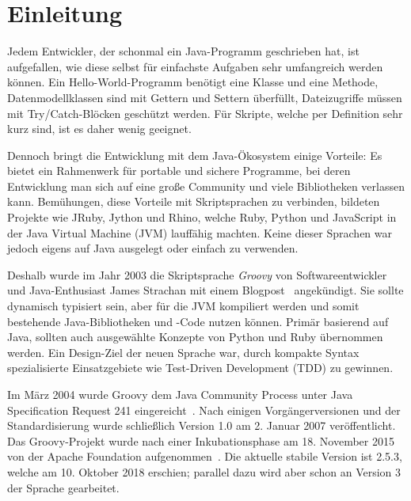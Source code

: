 \documentclass[a4paper]{article}
\title{\paperTitle}
\author{\paperAuthor}
\date{\paperDate}
\begin{document}

\maketitle


\section{Einleitung}\label{sec:einleitung}

Jedem Entwickler, der schonmal ein Java-Programm geschrieben hat, ist aufgefallen, wie diese selbst für einfachste Aufgaben sehr umfangreich werden können.
Ein Hello-World-Programm benötigt eine Klasse und eine Methode, Datenmodellklassen sind mit Gettern und Settern überfüllt, Dateizugriffe müssen mit Try/Catch-Blöcken geschützt werden.
Für Skripte, welche per Definition sehr kurz sind, ist es daher wenig geeignet.

Dennoch bringt die Entwicklung mit dem Java-Ökosystem einige Vorteile:
Es bietet ein Rahmenwerk für portable und sichere Programme, bei deren Entwicklung man sich auf eine große Community und viele Bibliotheken verlassen kann.
Bemühungen, diese Vorteile mit Skriptsprachen zu verbinden, bildeten Projekte wie JRuby, Jython und Rhino, welche Ruby, Python und JavaScript in der Java Virtual Machine (JVM) lauffähig machten.
Keine dieser Sprachen war jedoch eigens auf Java ausgelegt oder einfach zu verwenden.

Deshalb wurde im Jahr 2003 die Skriptsprache \emph{Groovy} von Softwareentwickler und Java-Enthusiast James Strachan mit einem Blogpost~\cite{james-strachan-blog} angekündigt.
Sie sollte dynamisch typisiert sein, aber für die JVM kompiliert werden und somit bestehende Java-Bibliotheken und -Code nutzen können.
Primär basierend auf Java, sollten auch ausgewählte Konzepte von Python und Ruby übernommen werden.
Ein Design-Ziel der neuen Sprache war, durch kompakte Syntax spezialisierte Einsatzgebiete wie Test-Driven Development (TDD) zu gewinnen.

Im März 2004 wurde Groovy dem Java Community Process unter Java Specification Request 241 eingereicht~\cite{jcp:jsr241}.
Nach einigen Vorgängerversionen und der Standardisierung wurde schließlich Version 1.0 am 2. Januar 2007 veröffentlicht.
Das Groovy-Projekt wurde nach einer Inkubationsphase am 18. November 2015 von der Apache Foundation aufgenommen~\cite{apache-incubator:groovy}.
Die aktuelle stabile Version ist 2.5.3, welche am 10. Oktober 2018 erschien; parallel dazu wird aber schon an Version 3 der Sprache gearbeitet.
\end{document}
